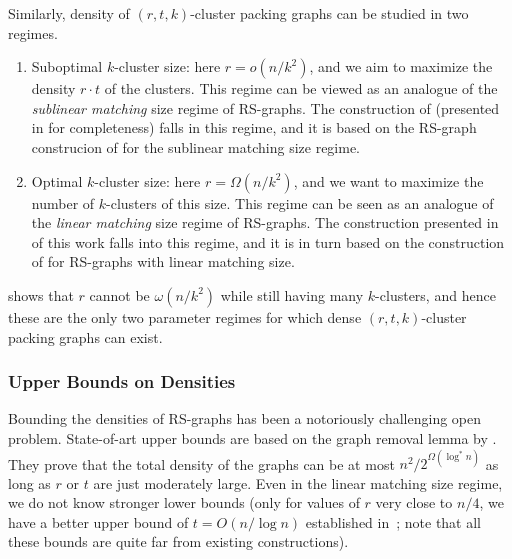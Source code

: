 \documentclass[11pt]{article}
\theoremstyle{definition}
\newcommand{\logstar}[1]{\ensuremath{\log^{*}\!{#1}}}
\begin{document}
\noindent
Similarly, density of $(r,t,k)$-cluster packing graphs can be studied in two regimes. 
\begin{enumerate}[label=$(\roman*)$]
	\item Suboptimal $k$-cluster size: here $r = o(n/k^2)$, and we aim to maximize the density $r \cdot t$ of the clusters. 
	This regime can be viewed as an analogue of the \emph{sublinear matching} size regime of RS-graphs.
	The construction of \cite{AssadiKNS24} (presented in  for completeness) falls in this regime, and it is based on the RS-graph construcion of \cite{RuzsaS78} for the sublinear matching size regime. 
	\item Optimal $k$-cluster size: here $r = \Omega(n/k^2)$, and we want to maximize the number of $k$-clusters of this size. This regime can be seen as an analogue of the \emph{linear matching} size regime of RS-graphs. The construction presented in  of this work falls into this regime, and it is in turn based on the construction of \cite{FischerLNRRS02} for RS-graphs with linear matching size. 
\end{enumerate}

  shows that $r$ cannot be $\omega(n/k^2)$ while still having many $k$-clusters, and hence these are the only two parameter regimes for which dense $(r,t,k)$-cluster packing graphs can exist. 

\subsubsection*{Upper Bounds on Densities}

Bounding the densities of RS-graphs has been a notoriously challenging open problem. State-of-art upper bounds are based on the graph removal lemma by \cite{Fox12}. They prove that the total density of the graphs can be at most $n^2/2^{\Omega(\logstar{n})}$
as long as $r$ or $t$ are just moderately large. Even in the linear matching size regime, we do not know stronger lower bounds (only for values of $r$ very close to $n/4$, we have 
a better upper bound of $t = O(n/\log{n})$ established in~\cite{FoxHS17}; note that all these bounds are quite far from existing constructions). 
\end{document}
